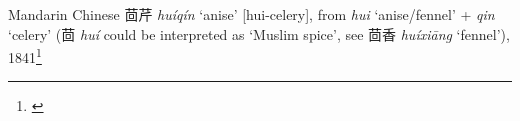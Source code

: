 \begin{etymology}\label{ety:huiqin}
Mandarin Chinese {茴芹} \textit{huíqín} `anise' [hui-celery], from \textit{hui} `anise/fennel' + \textit{qin} `celery' (茴 \textit{huí} could be interpreted as `Muslim spice', see 茴香 \textit{huíxiāng} `fennel'), 1841\footnote{\textcite{kleeman_oxford_2010, hu_food_2005}}
\end{etymology}